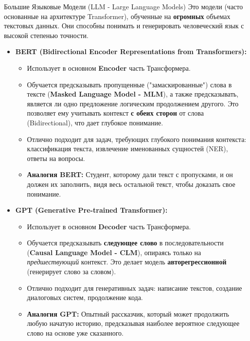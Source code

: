 \begin{myblock}{Большие Языковые Модели (LLM - Large Language Models)}
    Это модели (часто основанные на архитектуре Transformer), обученные на \textbf{огромных} объемах текстовых данных. Они способны понимать и генерировать человеческий язык с высокой степенью точности.
    \begin{itemize}
        \item \textbf{BERT (Bidirectional Encoder Representations from Transformers):}
            \begin{itemize}
                \item Использует в основном \textbf{Encoder} часть Трансформера.
                \item Обучается предсказывать пропущенные ("замаскированные") слова в тексте (\textbf{Masked Language Model - MLM}), а также предсказывать, является ли одно предложение логическим продолжением другого. Это позволяет ему учитывать контекст \textbf{с обеих сторон} от слова (Bidirectional), что дает глубокое понимание.
                \item Отлично подходит для задач, требующих глубокого понимания контекста: классификация текста, извлечение именованных сущностей (NER), ответы на вопросы.
                \item \textbf{Аналогия BERT:} Студент, которому дали текст с пропусками, и он должен их заполнить, видя весь остальной текст, чтобы доказать свое понимание.
            \end{itemize}
        \item \textbf{GPT (Generative Pre-trained Transformer):}
            \begin{itemize}
                \item Использует в основном \textbf{Decoder} часть Трансформера.
                \item Обучается предсказывать \textbf{следующее слово} в последовательности (\textbf{Causal Language Model - CLM}), опираясь только на \textit{предшествующий} контекст. Это делает модель \textbf{авторегрессионной} (генерирует слово за словом).
                \item Отлично подходит для генеративных задач: написание текстов, создание диалоговых систем, продолжение кода.
                \item \textbf{Аналогия GPT:} Опытный рассказчик, который может продолжить любую начатую историю, предсказывая наиболее вероятное следующее слово на основе уже сказанного.
            \end{itemize}
    \end{itemize}
\end{myblock}

